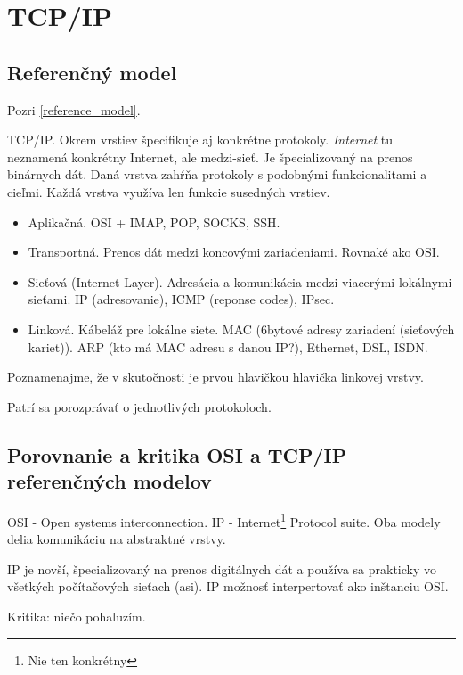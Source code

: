 \documentclass[10pt,a4paper]{article}
\begin{document}
\section{TCP/IP}    
\label{OSI}              
\subsection{Referenčný model}        
Pozri \ref{reference_model}.

TCP/IP. Okrem vrstiev špecifikuje aj konkrétne protokoly. \emph{Internet} tu neznamená konkrétny Internet, ale medzi-sieť. Je špecializovaný na prenos binárnych dát. 
Daná vrstva zahŕňa protokoly s podobnými funkcionalitami a cieľmi. Každá vrstva využíva len funkcie susedných vrstiev. 
 
\begin{itemize}
\item Aplikačná. OSI + IMAP, POP, SOCKS, SSH.            
\item Transportná. Prenos dát medzi koncovými zariadeniami. Rovnaké ako OSI.     
\item Sieťová (Internet Layer). Adresácia a komunikácia medzi viacerými lokálnymi sieťami. IP (adresovanie), ICMP (reponse codes), IPsec.      
\item Linková. Kábeláž pre lokálne siete. MAC (6bytové adresy zariadení (sieťových kariet)). ARP (kto má MAC adresu s danou IP?), Ethernet, DSL, ISDN.      
\end{itemize}

Poznamenajme, že v skutočnosti je prvou hlavičkou hlavička linkovej vrstvy. 

Patrí sa porozprávať o jednotlivých protokoloch. 

\subsection{Porovnanie a kritika OSI a TCP/IP referenčných modelov}    

OSI - Open systems interconnection. IP - Internet\footnote{Nie ten konkrétny} Protocol suite. Oba modely delia komunikáciu na abstraktné vrstvy. 

IP je novší, špecializovaný na prenos digitálnych dát a používa sa prakticky vo všetkých počítačových sieťach (asi).
IP možnosť interpertovať ako inštanciu OSI.  

Kritika: niečo pohaluzím. 
        
\end{document}
